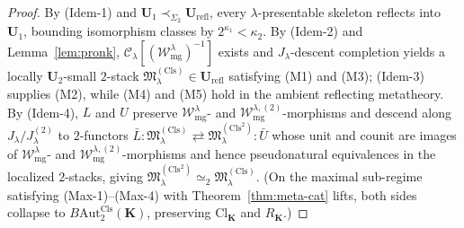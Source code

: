 \documentclass[11pt]{article}
\theoremstyle{plain}
\theoremstyle{definition}
\newcommand{\cC}{\mathcal{C}}
\newcommand{\fM}{\mathfrak{M}}
\newcommand{\Cl}{\mathrm{Cl}}
\begin{document}
\begin{proof}
By \textup{(Idem-1)} and $\mathbf{U}_1 \prec_{\Sigma_2} \mathbf{U}_{\mathrm{refl}}$, every $\lambda$-presentable skeleton reflects into $\mathbf{U}_1$, bounding isomorphism classes by $2^{\kappa_1} < \kappa_2$. By \textup{(Idem-2)} and Lemma~\ref{lem:pronk}, $\cC_\lambda[(\mathcal{W}_{\mathrm{mg}}^\lambda)^{-1}]$ exists and $J_\lambda$-descent completion yields a locally $\mathbf{U}_2$-small $2$-stack $\fM^{(\mathrm{Cls})}_\lambda \in \mathbf{U}_{\mathrm{refl}}$ satisfying \textup{(M1)} and \textup{(M3)}; \textup{(Idem-3)} supplies \textup{(M2)}, while \textup{(M4)} and \textup{(M5)} hold in the ambient reflecting metatheory. By \textup{(Idem-4)}, $L$ and $U$ preserve $\mathcal{W}_{\mathrm{mg}}^\lambda$- and $\mathcal{W}_{\mathrm{mg}}^{\lambda,(2)}$-morphisms and descend along $J_\lambda / J_\lambda^{(2)}$ to $2$-functors $\bar{L} : \fM^{(\mathrm{Cls})}_\lambda \rightleftarrows \fM^{(\mathrm{Cls}^2)}_\lambda : \bar{U}$ whose unit and counit are images of $\mathcal{W}_{\mathrm{mg}}^\lambda$- and $\mathcal{W}_{\mathrm{mg}}^{\lambda,(2)}$-morphisms and hence pseudonatural equivalences in the localized $2$-stacks, giving $\fM^{(\mathrm{Cls}^2)}_\lambda \simeq_2 \fM^{(\mathrm{Cls})}_\lambda$. (On the maximal sub-regime satisfying \textup{(Max-1)--(Max-4)} with Theorem~\ref{thm:meta-cat} lifts, both sides collapse to $B\mathrm{Aut}_2^{\mathrm{Cls}}(\mathbf{K})$, preserving $\Cl_{\mathbf{K}}$ and $R_{\mathbf{K}}$.)
\end{proof}
\end{document}

